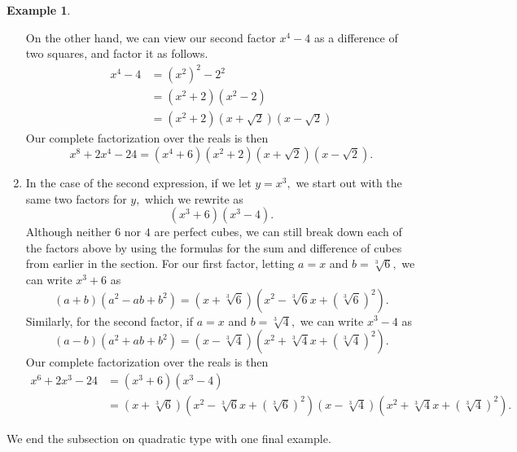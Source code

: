 \documentclass[12pt]{book}
\theoremstyle{definition}
\newtheorem{example}{Example}
\begin{document}
\begin{example}
\begin{enumerate}
\par
On the other hand, we can view our second factor $x^4-4$ as a difference of two squares, and factor it as follows.
\begin{equation*}
\begin{split}
x^4-4&=\left(x^2\right)^2-2^2\\
&=\left(x^2+2\right)\left(x^2-2\right)\\
&=\left(x^2+2\right)\left(x+\sqrt{2}\right)\left(x-\sqrt{2}\right)
\end{split}
\end{equation*}
Our complete factorization over the reals is then
$$x^8+2x^4-24=\left(x^4+6\right)\left(x^2+2\right)\left(x+\sqrt{2}\right)\left(x-\sqrt{2}\right).$$
\item In the case of the second expression, if we let $y=x^3,$ we start out with the same two factors for $y,$ which we rewrite as $$\left(x^3+6\right)\left(x^3-4\right).$$
Although neither $6$ nor $4$ are perfect cubes, we can still break down each of the factors above by using the formulas for the sum and difference of cubes from earlier in the section.  For our first factor, letting $a=x$ and $b=\sqrt[3]{6},$ we can write $x^3+6$ as 
$$\left(a+b\right)\left(a^2-ab+b^2\right)=\left(x+\sqrt[3]{6}\right)\left(x^2-\sqrt[3]{6}x+\left(\sqrt[3]{6}\right)^2\right).$$
Similarly, for the second factor, if $a=x$ and $b=\sqrt[3]{4},$ we can write $x^3-4$ as
$$\left(a-b\right)\left(a^2+ab+b^2\right)=\left(x-\sqrt[3]{4}\right)\left(x^2+\sqrt[3]{4}x+\left(\sqrt[3]{4}\right)^2\right).$$
Our complete factorization over the reals is then
\begin{equation*}
\begin{split}
x^6+2x^3-24&=\left(x^3+6\right)\left(x^3-4\right)\\
&=\left(x+\sqrt[3]{6}\right)\left(x^2-\sqrt[3]{6}x+\left(\sqrt[3]{6}\right)^2\right)\left(x-\sqrt[3]{4}\right)\left(x^2+\sqrt[3]{4}x+\left(\sqrt[3]{4}\right)^2\right).
\end{split}
\end{equation*}
\end{enumerate}
\end{example}
We end the subsection on quadratic type with one final example.
\end{document}
